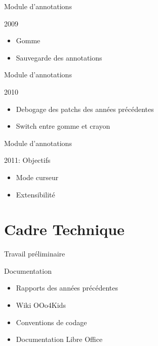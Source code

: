 \documentclass[handout]{beamer}
\begin{document}
\begin{frame}{Module d'annotations}
    \begin{block}{2009}
        \begin{itemize}[<+->]
            \item Gomme
	    \item Sauvegarde des annotations
        \end{itemize}
    \end{block}
\end{frame}

\begin{frame}{Module d'annotations}
    \begin{block}{2010}
        \begin{itemize}[<+->]
            \item Debogage des patchs des années précédentes
	    \item Switch entre gomme et crayon
        \end{itemize}
    \end{block}
\end{frame}

\begin{frame}{Module d'annotations}
    \begin{block}{2011: Objectifs}
        \begin{itemize}[<+->]
            \item Mode curseur
            \item Extensibilité
        \end{itemize}
    \end{block}
\end{frame}

\section{Cadre Technique}

\begin{frame}{Travail préliminaire}
    \begin{block}{Documentation}
        \begin{itemize}[<+->]
            \item Rapports des années précédentes
            \item Wiki OOo4Kids
            \item Conventions de codage
            \item Documentation Libre Office
        \end{itemize}
    \end{block}
\end{frame}
\end{document}
